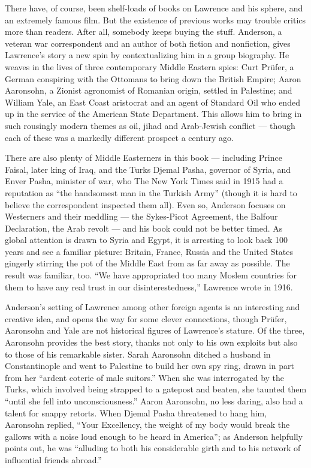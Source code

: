 There have, of course, been shelf-loads of books on Lawrence and his
sphere, and an extremely famous film. But the existence of previous
works may trouble critics more than readers. After all, somebody keeps
buying the stuff. Anderson, a veteran war correspondent and an author of
both fiction and nonfiction, gives Lawrence's story a new spin by
contextualizing him in a group biography. He weaves in the lives of
three contemporary Middle Eastern spies: Curt Prüfer, a German
conspiring with the Ottomans to bring down the British Empire; Aaron
Aaronsohn, a Zionist agronomist of Romanian origin, settled in
Palestine; and William Yale, an East Coast aristocrat and an agent of
Standard Oil who ended up in the service of the American State
Department. This allows him to bring in such rousingly modern themes as
oil, jihad and Arab-Jewish conflict --- though each of these was a
markedly different prospect a century ago.

There are also plenty of Middle Easterners in this book --- including
Prince Faisal, later king of Iraq, and the Turks Djemal Pasha, governor
of Syria, and Enver Pasha, minister of war, who The New York Times said
in 1915 had a reputation as ``the handsomest man in the Turkish Army''
(though it is hard to believe the correspondent inspected them all).
Even so, Anderson focuses on Westerners and their meddling --- the
Sykes-Picot Agreement, the Balfour Declaration, the Arab revolt --- and
his book could not be better timed. As global attention is drawn to
Syria and Egypt, it is arresting to look back 100 years and see a
familiar picture: Britain, France, Russia and the United States gingerly
stirring the pot of the Middle East from as far away as possible. The
result was familiar, too. ``We have appropriated too many Moslem
countries for them to have any real trust in our disinterestedness,''
Lawrence wrote in 1916.

Anderson's setting of Lawrence among other foreign agents is an
interesting and creative idea, and opens the way for some clever
connections, though Prüfer, Aaronsohn and Yale are not historical
figures of Lawrence's stature. Of the three, Aaronsohn provides the best
story, thanks not only to his own exploits but also to those of his
remarkable sister. Sarah Aaronsohn ditched a husband in Constantinople
and went to Palestine to build her own spy ring, drawn in part from her
``ardent coterie of male suitors.'' When she was interrogated by the
Turks, which involved being strapped to a gatepost and beaten, she
taunted them ``until she fell into unconsciousness.'' Aaron Aaronsohn,
no less daring, also had a talent for snappy retorts. When Djemal Pasha
threatened to hang him, Aaronsohn replied, ``Your Excellency, the weight
of my body would break the gallows with a noise loud enough to be heard
in America''; as Anderson helpfully points out, he was ``alluding to
both his considerable girth and to his network of influential friends
abroad.''

